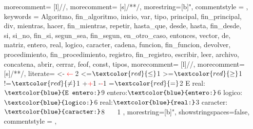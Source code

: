 
                  {
                    morecomment= [l]{//},
                   morecomment= [s]{/*}{*/},
                   morestring=[b]",
                    commentstyle = \color{ccomentarios},
                    keywords =
                    { Algoritmo,
                      fin_algoritmo,
                      inicio,
                      var,
                      tipo,
                      principal,
                      fin_principal,
                      div,
                      mientras,
                      hacer,
                      fin_mientras,
                      repetir,
                      hasta_que,
                      desde,
                      hasta,
                      fin_desde,
                      si,
                      si_no,
                      fin_si,
                      segun_sea,
                      fin_segun,
                      en_otro_caso,
                      entonces,
                      vector,
                      de,
                      matriz,
                      entero,
                      real,
                      logico,
                      caracter,
                      cadena,
                      funcion,
                      fin_funcion,
                      devolver,
                      procedimiento,
                      fin_procedimiento,
                      registro,
                      fin_registro,
                      escribir,
                      leer,
                      archivo,
                      concatena,
                      abrir,
                      cerrar,
                      feof,
                      const,
                      tipos},
                      morecomment= [l]{//},
                      morecomment= [s]{/*}{*/},
                      literate={
                      {<-}{{\textcolor{red}{{$\leftarrow$}}}}2
                      {<=}{{$\textcolor{red}{\leq}$}}1
                      {>=}{{$\textcolor{red}{\geq}$}}1
                      {!=}{{$\textcolor{red}{\neq}$}}1
                      {+}{{\textcolor{red}{+}}}1
                      {-}{{\textcolor{red}{-}}}1
                      {=}{{$\textcolor{red}{=}$}}2
                      {E real:}{{$\texttt{\textcolor{blue}{E entero:}}$}}9
                      {entero:}{{$\texttt{\textcolor{blue}{entero:}}$}}6
                      {logico:}{{$\texttt{\textcolor{blue}{logico:}}$}}6
                      {real:}{{$\texttt{\textcolor{blue}{real:}}$}}3
                      {caracter:}{{$\texttt{\textcolor{blue}{caracter:}}$}}8
                      {\ \ }{{\ }}1}
                      ,
                   morestring=[b]",
                   showstringspaces=false,
                    commentstyle = \color{ccomentarios},
                  }
